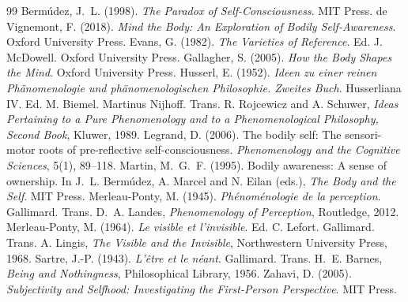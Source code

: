 \documentclass{situationist-preprint}
\begin{document}
\begin{thebibliography}{99}\small
{} Berm\'udez, J.~L. (1998). \emph{The Paradox of Self-Consciousness}. MIT Press.
 de Vignemont, F. (2018). \emph{Mind the Body: An Exploration of Bodily Self-Awareness}. Oxford University Press.
 Evans, G. (1982). \emph{The Varieties of Reference}. Ed. J. McDowell. Oxford University Press.
 Gallagher, S. (2005). \emph{How the Body Shapes the Mind}. Oxford University Press.
 Husserl, E. (1952). \emph{Ideen zu einer reinen Ph\"anomenologie und ph\"anomenologischen Philosophie. Zweites Buch}. Husserliana IV. Ed. M. Biemel. Martinus Nijhoff. Trans. R. Rojcewicz and A. Schuwer, \emph{Ideas Pertaining to a Pure Phenomenology and to a Phenomenological Philosophy, Second Book}, Kluwer, 1989.
 Legrand, D. (2006). The bodily self: The sensori-motor roots of pre-reflective self-consciousness. \emph{Phenomenology and the Cognitive Sciences}, 5(1), 89--118.
 Martin, M.~G.~F. (1995). Bodily awareness: A sense of ownership. In J.~L. Berm\'udez, A. Marcel and N. Eilan (eds.), \emph{The Body and the Self}. MIT Press.
 Merleau-Ponty, M. (1945). \emph{Ph\'enom\'enologie de la perception}. Gallimard. Trans. D.~A. Landes, \emph{Phenomenology of Perception}, Routledge, 2012.
 Merleau-Ponty, M. (1964). \emph{Le visible et l'invisible}. Ed. C. Lefort. Gallimard. Trans. A. Lingis, \emph{The Visible and the Invisible}, Northwestern University Press, 1968.
 Sartre, J.-P. (1943). \emph{L'\^etre et le n\'eant}. Gallimard. Trans. H.~E. Barnes, \emph{Being and Nothingness}, Philosophical Library, 1956.
 Zahavi, D. (2005). \emph{Subjectivity and Selfhood: Investigating the First-Person Perspective}. MIT Press.
\end{thebibliography}
\end{document}
